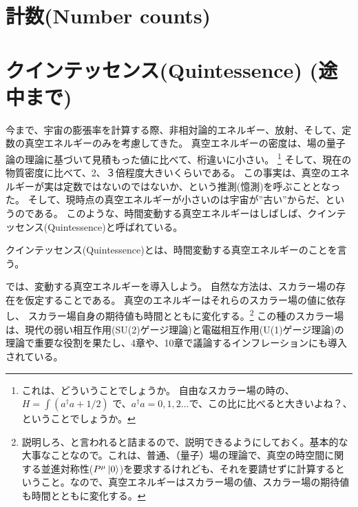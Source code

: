 \documentclass[11pt]{ltjsarticle}
\theoremstyle{plain}
\theoremstyle{break}
\begin{document}
\newpage
\section{計数(Number counts)}\label{sec1-11:Number-counts}
\newpage
\section{クインテッセンス(Quintessence) (途中まで)}\label{sec1-12:Quintessence}

今まで、宇宙の膨張率を計算する際、非相対論的エネルギー、放射、そして、定数の真空エネルギーのみを考慮してきた。
真空エネルギーの密度は、場の量子論の理論に基づいて見積もった値に比べて、桁違いに小さい。
\footnote{これは、どういうことでしょうか。
自由なスカラー場の時の、$H= \int {(a^{\dagger}a +1/2)}$ で、$a^{\dagger}a = 0,1,2 \dots $で、この比に比べると大きいよね？、ということでしょうか。}
そして、現在の物質密度に比べて、2、３倍程度大きいくらいである。
この事実は、真空のエネルギーが実は定数ではないのではないか、という推測(憶測)を呼ぶこととなった。
そして、現時点の真空エネルギーが小さいのは宇宙が”古い”からだ、というのである。
このような、時間変動する真空エネルギーはしばしば、クインテッセンス(Quintessence)と呼ばれている。
\begin{definition}
クインテッセンス(Quintessence)とは、時間変動する真空エネルギーのことを言う。
\end{definition}

では、変動する真空エネルギーを導入しよう。
自然な方法は、スカラー場の存在を仮定することである。
真空のエネルギーはそれらのスカラー場の値に依存し、
スカラー場自身の期待値も時間とともに変化する。\footnote{説明しろ、と言われると詰まるので、説明できるようにしておく。基本的な大事なことなので。これは、普通、（量子）場の理論で、真空の時空間に関する並進対称性($P^{\mu}\ket{0}$)を要求するけれども、それを要請せずに計算するということ。なので、真空エネルギーはスカラー場の値、スカラー場の期待値も時間とともに変化する。}
この種のスカラー場は、現代の弱い相互作用(SU(2)ゲージ理論)と電磁相互作用(U(1)ゲージ理論)の理論で重要な役割を果たし、4章や、10章で議論するインフレーションにも導入されている。
\end{document}
